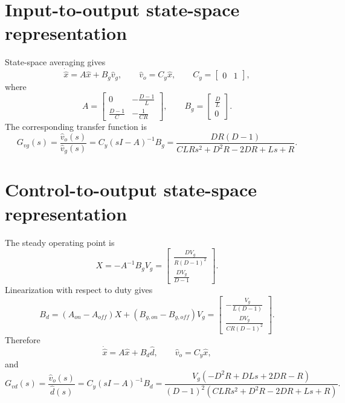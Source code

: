 \documentclass[11pt]{article}
\begin{document}
\section*{Input-to-output state-space representation}
State-space averaging gives
\begin{equation}
\dot{\hat x}=A\hat x+B_g\hat v_g,\qquad
\hat v_o=C_y\hat x,\qquad C_y=\begin{bmatrix}0&1\end{bmatrix},
\end{equation}
where
\begin{equation}
A=\left[\begin{matrix}0 & - \frac{D - 1}{L}\\\frac{D - 1}{C} & - \frac{1}{C R}\end{matrix}\right],\qquad B_g=\left[\begin{matrix}\frac{D}{L}\\0\end{matrix}\right].
\end{equation}
The corresponding transfer function is
\begin{equation}
G_{vg}(s)=\frac{\hat v_o(s)}{\hat v_g(s)}
=C_y(sI-A)^{-1}B_g=\frac{D R \left(D - 1\right)}{C L R s^{2} + D^{2} R - 2 D R + L s + R}.
\end{equation}

\section*{Control-to-output state-space representation}
The steady operating point is
\begin{equation}
X=-A^{-1}B_gV_g=\left[\begin{matrix}\frac{D V_{g}}{R \left(D - 1\right)^{2}}\\\frac{D V_{g}}{D - 1}\end{matrix}\right].
\end{equation}
Linearization with respect to duty gives
\begin{equation}
B_d=(A_{on}-A_{off})X+(B_{g,on}-B_{g,off})V_g
=\left[\begin{matrix}- \frac{V_{g}}{L \left(D - 1\right)}\\\frac{D V_{g}}{C R \left(D - 1\right)^{2}}\end{matrix}\right].
\end{equation}
Therefore
\begin{equation}
\dot{\hat x}=A\hat x+B_d\hat d,\qquad
\hat v_o=C_y\hat x,
\end{equation}
and
\begin{equation}
G_{vd}(s)=\frac{\hat v_o(s)}{\hat d(s)}
=C_y(sI-A)^{-1}B_d=\frac{V_{g} \left(- D^{2} R + D L s + 2 D R - R\right)}{\left(D - 1\right)^{2} \left(C L R s^{2} + D^{2} R - 2 D R + L s + R\right)}.
\end{equation}
\end{document}
